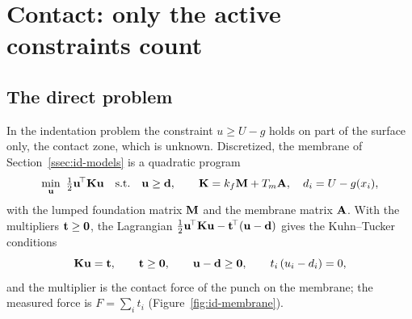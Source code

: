 \section{Contact: only the active constraints count}\label{sec:id-contact}
%
\subsection{The direct problem}
In the indentation problem the constraint $u\ge U-g$ holds on part of the
surface only, the contact zone, which is unknown. Discretized, the membrane of
Section~\ref{ssec:id-models} is a quadratic program
\begin{equation}\label{eq:id-contact}
  \min_{\mathbf{u}}\ \tfrac12\mathbf{u}^{\!\top}\mathbf{K}\mathbf{u}
  \quad\text{s.t.}\quad \mathbf{u}\ge\mathbf{d},\qquad
  \mathbf{K}=k_f\mathbf{M}+T_m\mathbf{A},\quad d_i=U-g(x_i),
\end{equation}
with the lumped foundation matrix $\mathbf{M}$ and the membrane matrix $\mathbf{A}$.
With the multipliers $\mathbf{t}\ge\mathbf{0}$, the Lagrangian
$\tfrac12\mathbf{u}^{\!\top}\mathbf{K}\mathbf{u}-\mathbf{t}^{\!\top}(\mathbf{u}-\mathbf{d})$ gives the Kuhn--Tucker
conditions
\begin{equation}\label{eq:id-contact-kt}
  \mathbf{K}\mathbf{u}=\mathbf{t},\qquad \mathbf{t}\ge\mathbf{0},\qquad \mathbf{u}-\mathbf{d}\ge\mathbf{0},\qquad
  t_i\,(u_i-d_i)=0 ,
\end{equation}
and the multiplier is the contact force of the punch on the membrane; the
measured force is $F=\sum_it_i$ (Figure~\ref{fig:id-membrane}).

